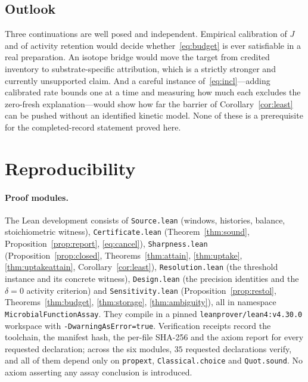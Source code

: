 \documentclass[11pt]{article}
\theoremstyle{plain}
\theoremstyle{definition}
\theoremstyle{remark}
\begin{document}
\subsection{Outlook}

Three continuations are well posed and independent. Empirical calibration of
$J$ and of activity retention would decide whether~\eqref{eq:budget} is ever
satisfiable in a real preparation. An isotope bridge would move the target
from credited inventory to substrate-specific attribution, which is a strictly
stronger and currently unsupported claim. And a careful instance
of~\eqref{eq:incl}---adding calibrated rate bounds one at a time and measuring
how much each excludes the zero-fresh explanation---would show how far the
barrier of Corollary~\ref{cor:least} can be pushed without an identified
kinetic model. None of these is a prerequisite for the completed-record
statement proved here.

\appendix

\section{Reproducibility}\label{app:repro}

\paragraph{Proof modules.} The Lean development consists of
\texttt{Source.lean} (windows, histories, balance, stoichiometric witness),
\texttt{Certificate.lean} (Theorem~\ref{thm:sound},
Proposition~\ref{prop:report}, \eqref{eq:cancel}),
\texttt{Sharpness.lean} (Proposition~\ref{prop:closed},
Theorems~\ref{thm:attain}, \ref{thm:uptake}, \ref{thm:uptakeattain},
Corollary~\ref{cor:least}), \texttt{Resolution.lean} (the threshold instance
and its concrete witness), \texttt{Design.lean} (the precision identities and
the $\delta=0$ activity criterion) and \texttt{Sensitivity.lean}
(Proposition~\ref{prop:restol}, Theorems~\ref{thm:budget},
\ref{thm:storage}, \ref{thm:ambiguity}), all in namespace
\texttt{MicrobialFunctionAssay}. They compile in a pinned
\texttt{leanprover/lean4:v4.30.0} workspace with
\texttt{-DwarningAsError=true}. Verification receipts record the toolchain,
the manifest hash, the per-file SHA-256 and the axiom report for every
requested declaration; across the six modules, $35$ requested declarations
verify, and all of them depend only on \texttt{propext},
\texttt{Classical.choice} and \texttt{Quot.sound}. No axiom asserting any
assay conclusion is introduced.
\end{document}
